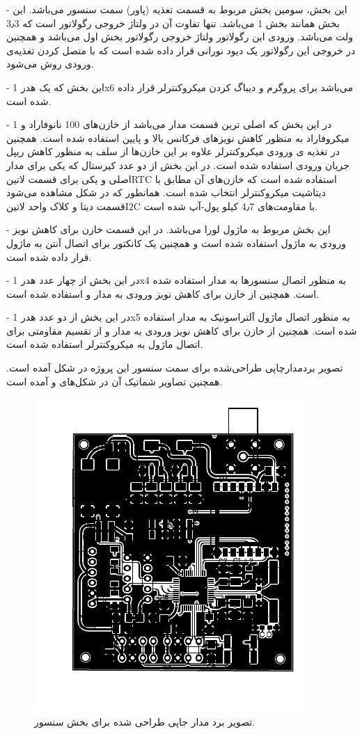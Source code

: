 - این بخش، سومین بخش مربوط به قسمت تغذیه (پاور) سمت سنسور می‌باشد. این بخش همانند بخش 1 می‌باشد. تنها تفاوت آن در ولتاژ خروجی رگولاتور است که 3٫3 ولت می‌باشد. ورودی این رگولاتور ولتاژ خروجی رگولاتور بخش اول می‌باشد و همچنین در خروجی این رگولاتور یک دیود نورانی قرار داده شده است که با متصل کردن تغذیه‌ی ورودی روش می‌شود.

- این بخش که یک هدر 1x6 می‌باشد برای پروگرم و دیباگ کردن میکروکنترلر قرار داده شده است.

- در این بخش که اصلی ترین قسمت مدار می‌باشد از خازن‌های 100 نانو‌فاراد و 1 میکروفاراد به منظور کاهش نویزهای فرکانس بالا و پایین استفاده شده است. همچنین در تغذیه ی ورودی میکروکنترلر علاوه بر این خازن‌ها از سلف به منظور کاهش ریپل جریان ورودی استفاده شده است. در این بخش از دو عدد کیرستال که یکی برای مدار اصلی و یکی برای قسمت ‌لاتین{RTC} استفاده شده است که خازن‌های آن مطابق با دیتاشیت میکروکنترلر انتخاب شده است. همانطور که در شکل مشاهده می‌شود قسمت دیتا و کلاک واحد ‌لاتین{I2C} با مقاومت‌های 4٫7 کیلو پول-آپ شده است.

- این بخش مربوط به ماژول لورا می‌باشد. در این قسمت خازن برای کاهش نویز ورودی به ماژول استفاده شده است و همچنین یک کانکتور برای اتصال آنتن به ماژول قرار داده شده است. 

- در این بخش از چهار عدد هدر 1x4 به منظور اتصال سنسورها به مدار استفاده شده است. همچنین از خازن برای کاهش نویز ورودی به مدار و استفاده شده است.

- در این بخش از دو عدد هدر 1x5 به منظور اتصال ماژول آلتراسونیک به مدار استفاده شده است. همچنین از خازن برای کاهش نویز ورودی به مدار و از تقسیم مقاومتی برای اتصال ماژول به میکروکنترلر استفاده شده است.  

\noindent
تصویر بردمدارچاپی طراحی‌شده برای سمت سنسور این پروژه در شکل  آمده است. همچنین تصاویر شماتیک آن در شکل‌های  و  آمده است.


\begin{figure}[H]
	\centering
	\includegraphics[width=0.7\linewidth]{Assets/PCB_Transmiter.pdf}
	\caption{تصویر برد مدار جاپی طراحی شده برای بخش سنسور.}
	\label{fig:PCBTransmiter}
\end{figure}

